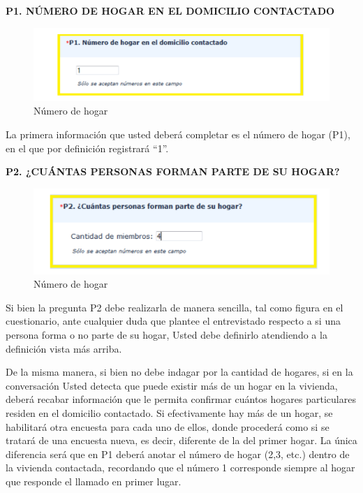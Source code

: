 \documentclass[
  openany]{book}
\begin{document}
\textbf{P1. NÚMERO DE HOGAR EN EL DOMICILIO CONTACTADO}

\begin{figure}

{\centering \includegraphics[width=1\linewidth]{imagenes/figura6-46} 

}

\caption{Número de hogar}\label{fig:Localcomer567}
\end{figure}

La primera información que usted deberá completar es el número de hogar (P1), en el que por definición registrará ``1''.

\textbf{P2. ¿CUÁNTAS PERSONAS FORMAN PARTE DE SU HOGAR?}

\begin{figure}

{\centering \includegraphics[width=1\linewidth]{imagenes/figura6-47} 

}

\caption{Número de hogar}\label{fig:Localcomer56}
\end{figure}

Si bien la pregunta P2 debe realizarla de manera sencilla, tal como figura en el cuestionario, ante cualquier duda que plantee el entrevistado respecto a si una persona forma o no parte de su hogar, Usted debe definirlo atendiendo a la definición vista más arriba.

De la misma manera, si bien no debe indagar por la cantidad de hogares, si en la conversación Usted detecta que puede existir más de un hogar en la vivienda, deberá recabar información que le permita confirmar cuántos hogares particulares residen en el domicilio contactado. Si efectivamente hay más de un hogar, se habilitará otra encuesta para cada uno de ellos, donde procederá como si se tratará de una encuesta nueva, es decir, diferente de la del primer hogar. La única diferencia será que en P1 deberá anotar el número de hogar (2,3, etc.) dentro de la vivienda contactada, recordando que el número 1 corresponde siempre al hogar que responde el llamado en primer lugar.
\end{document}
